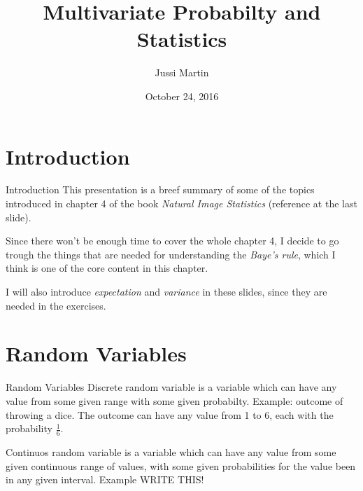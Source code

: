 \documentclass{beamer}
\title[Multivariate Probabilty and Statistics]{Multivariate Probabilty and Statistics}
\author{Jussi Martin}
\date{October 24, 2016}
\begin{document}
\begin{frame}
  \titlepage
\end{frame}


%
%
%
%
%

\section{Introduction}

\begin{frame}{Introduction}
  This presentation is a breef summary of some of the topics introduced in
  chapter 4 of the book \emph{Natural Image Statistics} (reference at
  the last slide).

  Since there won't be enough time to cover the whole chapter 4, I decide to go
  trough the things that are needed for understanding the \emph{Baye's rule},
  which I think is one of the core content in this chapter.

  I will also introduce \emph{expectation} and \emph{variance} in these slides,
  since they are needed in the exercises.
\end{frame}

\section{Random Variables}

\begin{frame}{Random Variables}
 Discrete random variable is a variable which can have any value from some given
 range with some given probabilty. Example: outcome of throwing a dice. The outcome
 can have any value from 1 to 6, each with the probability $\frac{1}{6}$.

 Continuos random variable is a variable which can have any value from some given
 continuous range of values, with some given probabilities for the value been in
 any given interval. Example WRITE THIS!
\end{frame}
\end{document}

